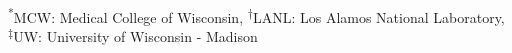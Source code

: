 \footnotesize
\centering
\textsuperscript{*}MCW: Medical College of Wisconsin, \textsuperscript{$\dagger$}LANL: Los Alamos National Laboratory, \textsuperscript{$\ddagger$}UW: University of Wisconsin - Madison \\





%
